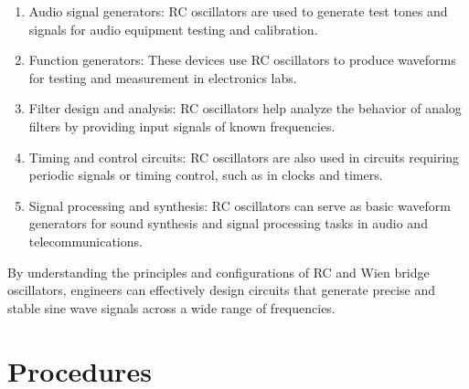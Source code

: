 \documentclass[12pt,a4paper]{report}
\begin{document}
\begin{enumerate}
    \item Audio signal generators: RC oscillators are used to generate test tones and signals for audio equipment testing and calibration.
    \item Function generators: These devices use RC oscillators to produce waveforms for testing and measurement in electronics labs.
    \item Filter design and analysis: RC oscillators help analyze the behavior of analog filters by providing input signals of known frequencies.
    \item Timing and control circuits: RC oscillators are also used in circuits requiring periodic signals or timing control, such as in clocks and timers.
    \item Signal processing and synthesis: RC oscillators can serve as basic waveform generators for sound synthesis and signal processing tasks in audio and telecommunications.
\end{enumerate}


By understanding the principles and configurations of RC and Wien bridge oscillators, engineers can effectively design circuits that generate precise and stable sine wave signals across a wide range of frequencies.

\section{Procedures}
\end{document}
